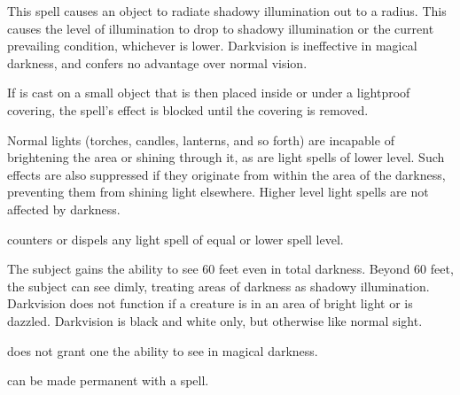 \spellrng{\rngtouch}
\begin{spelleffect}
  This spell causes an object to radiate shadowy illumination out to a \areamed radius. This causes the level of illumination to drop to shadowy illumination or the current prevailing condition, whichever is lower. Darkvision is ineffective in magical darkness, and confers no advantage over normal vision.
\end{spelleffect}
\begin{spellnotes}
  If  is cast on a small object that is then placed inside or under a lightproof covering, the spell's effect is blocked until the covering is removed.

  Normal lights (torches, candles, lanterns, and so forth) are incapable of brightening the area or shining through it, as are light spells of lower level. Such effects are also suppressed if they originate from within the area of the darkness, preventing them from shining light elsewhere. Higher level light spells are not affected by darkness.

  \par {} counters or dispels any light spell of equal or lower spell level.
\end{spellnotes}

\spellrng{\rngtouch}
\spelldur{\durlong}
\begin{spelleffect}
  The subject gains the ability to see 60 feet even in total darkness. Beyond 60 feet, the subject can see dimly, treating areas of darkness as shadowy illumination. Darkvision does not function if a creature is in an area of bright light or is dazzled. Darkvision is black and white only, but otherwise like normal sight.
\end{spelleffect}
\begin{spellnotes}
   does not grant one the ability to see in magical darkness.

  \par {} can be made permanent with a  spell.
\end{spellnotes}

